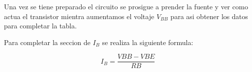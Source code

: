 \begin{figure}[!ht]
\begin{center}
\begin{minipage}{0.25\textwidth}
        \end{minipage} 
        \end{center}
        
        

        
        
        
    \end{figure}


    Una vez se tiene preparado el circuito se prosigue a prender la fuente y ver como actua el transistor mientra aumentamos el voltaje $V_{BB}$ para asi obtener los datos para completar la tabla.


    Para completar la seccion de $I_B$ se realiza la siguiente formula:


    \begin{center}
        \[I_B=\frac{VBB-VBE}{RB}\]
    \end{center}






        
            \begin{table}[h!]
            \centering
            \caption{Mediciones de $I_B$ y $V_{BE}$ para diferentes valores de $V_{BB}$. Valores de $I_B$ estimados según el comportamiento exponencial típico de la unión BE.}
        \end{table}




